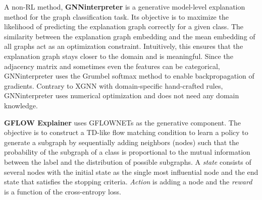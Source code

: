 A non-RL method, \textbf{GNNinterpreter} \cite{gnninterpreter} is a generative model-level explanation method for the graph classification task. Its objective is to maximize the likelihood of predicting the explanation graph correctly for a given class. The similarity between the explanation graph embedding and the mean embedding of all graphs act as an optimization constraint. Intuitively, this ensures that the explanation graph stays closer to the domain and is meaningful. Since the adjacency matrix and sometimes even the features can be categorical, GNNinterpreter uses the Grumbel softmax method \cite{repara-trick} to enable backpropagation of gradients. Contrary to XGNN with domain-specific hand-crafted rules, GNNinterpreter uses numerical optimization and does not need any domain knowledge.

\textbf{GFLOW Explainer} \cite{Gflow} uses GFLOWNETs as the generative component. The objective is to construct a TD-like flow matching condition \cite{bengio-gflownet} to learn a policy to generate a subgraph by sequentially adding neighbors (nodes) such that the probability of the subgraph of a class is proportional to the mutual information between the label and the distribution of possible subgraphs. A \textit{state} consists of several nodes with the initial state as the single most influential node and the end state that satisfies the stopping criteria. \textit{Action} is adding a node and the \textit{reward} is a function of the cross-entropy loss.

